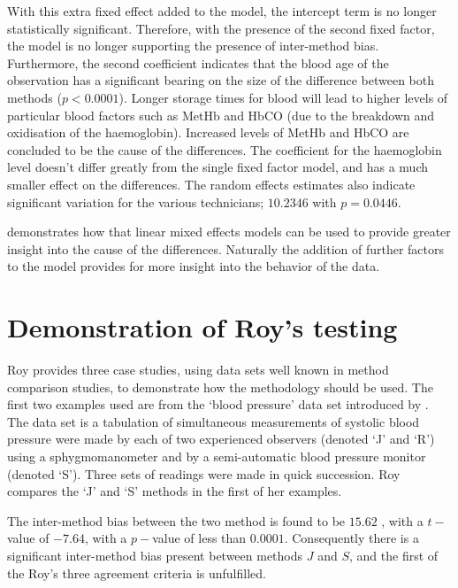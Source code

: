 \documentclass[12pt, a4paper]{report}
\theoremstyle{plain}
\theoremstyle{definition}
\theoremstyle{remark}
\begin{document}
		
		With this extra fixed effect added to the model, the intercept
		term is no longer statistically significant. Therefore, with the
		presence of the second fixed factor, the model is no longer
		supporting the presence of inter-method bias. Furthermore, the
		second coefficient indicates that the blood age of the observation
		has a significant bearing on the size of the difference between
		both methods ($p <0.0001$). Longer storage times for blood will
		lead to higher levels of particular blood factors such as MetHb
		and HbCO (due to the breakdown and oxidisation of the
		haemoglobin). Increased levels of MetHb and HbCO are concluded to
		be the cause of the differences. The coefficient for the
		haemoglobin level doesn't differ greatly from the single fixed
		factor model, and has a much smaller effect on the differences.
		The random effects estimates also indicate significant variation
		for the various technicians; $10.2346$ with $p=0.0446$.
		
		\citet{LaiShiao} demonstrates how that linear mixed effects models
		can be used to provide greater insight into the cause of the
		differences. Naturally the addition of further factors to the
		model provides for more insight into the behavior of the data.
		

	\section{Demonstration of Roy's testing}
	Roy provides three case studies, using data sets well known in method comparison studies, to demonstrate how the methodology should be used. The first two examples used are from the `blood pressure' data set introduced by \citet{BA99}. The data set is a tabulation of simultaneous measurements of systolic blood pressure were made by each of two experienced observers (denoted `J' and `R') using a sphygmomanometer and by a semi-automatic blood pressure monitor (denoted `S'). Three sets of readings were made in quick succession. Roy compares the `J' and `S' methods in the first of her examples.
	
	The inter-method bias between the two method is found to be $15.62$ , with a $t-$value of $-7.64$, with a $p-$value of less than $0.0001$. Consequently there is a significant inter-method bias present between methods $J$ and $S$, and the first of the Roy's three agreement criteria is unfulfilled.
	
\end{document}
